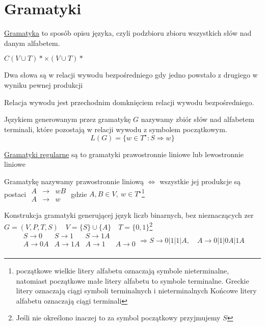 	\section{Gramatyki}
	
	\begin{df}
	\href{http://pl.wikipedia.org/wiki/Gramatyka_formalna}{Gramatyka} to sposób opisu języka, czyli podzbioru zbioru wszystkich
	 słów nad danym alfabetem.
	\end{df}
	\begin{df}
	$C(V \cup T)* \times (V \cup T)*$
	\end{df}
	
	\begin{tw}
	Dwa słowa są w relacji wywodu bezpośredniego gdy jedno powstało z drugiego w wyniku pewnej produkcji
	\end{tw}
	
	\begin{df}
	Relacja wywodu jest przechodnim domknięciem relacji wywodu bezpośredniego.
	\end{df}
	
	\begin{df}
	Językiem generowanym przez gramatykę $G$ nazywamy zbiór słów nad alfabetem terminali, które pozostają w relacji wywodu z 
	symbolem początkowym.
	$$ L(G) = \{ w\in T^\star: S \Rightarrow w \} $$
	\end{df}
	
	\begin{df}
	\href{http://pl.wikipedia.org/wiki/Gramatyka_regularna}{Gramatyki regularne} są to gramatyki prawostronnie liniowe lub 
	lewostronnie liniowe
	\end{df}
	
	\begin{df}
	Gramatykę nazywamy prawostronnie liniową $\Leftrightarrow$ wszystkie jej produkcje są postaci $\begin{matrix}
	A&\rightarrow&wB \\
	A&\rightarrow&w
	\end{matrix}$
	gdzie $A, B \in V, ~ w\in T^\star$\footnote{początkowe wielkie litery alfabetu oznaczają symbole nieterminalne, 
	natomiast początkowe małe litery alfabetu to symbole terminalne. Greckie litery oznaczają ciągi symboli terminalnych i nieterminalnych
	Końcowe litery alfabetu oznaczają ciągi terminali}	 
	\end{df}
	
	\begin{przyklad}
		Konstrukcja gramatyki generującej język liczb binarnych, bez nieznaczących zer \\
		$G = (V, P, T, S) \quad V = \{S\} \cup \{A\} \quad T = \{0, 1\}$\footnote{Jeśli nie określono inaczej to 
		za symbol początkowy przyjmujemy $S$}
		$$
		\begin{matrix}
		S \to 0 & S \to 1 & S \to 1A \\
		A \to 0A & A \to 1A & A \to 1 & A \to 0\\		
		\end{matrix}
		\Rightarrow
		S \to 0|1|1|A, \quad A \to 0|1|0A|1A
		$$
	\end{przyklad}		
	
